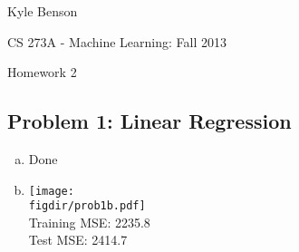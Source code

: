 \documentclass[twoside,11pt]{article}
\newcommand{\figdir}{figs}
\theoremstyle{definition}
\begin{document}
\centerline{\Large Kyle Benson}
\centerline{CS 273A - Machine Learning: Fall 2013}
\centerline{Homework 2}

\subsection*{Problem 1: Linear Regression}

\begin{enumerate}[(a)]
\item Done
\item \vspace{-1in}
\texttt{[image: \\figdir/prob1b.pdf]} \\
Training MSE: 2235.8 \\
Test MSE: 2414.7



\end{enumerate}
\end{document}
